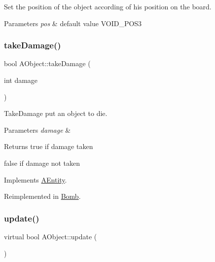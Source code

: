 Set the position of the object according of his position on the board. 


\begin{DoxyParams}{Parameters}
{\em pos} & default value V\+O\+I\+D\+\_\+\+P\+O\+S3 \\
\hline
\end{DoxyParams}
\mbox{\label{class_a_object_a39b1720ae5a820512ab4db0906f03b15}} 
\subsubsection{\texorpdfstring{take\+Damage()}{takeDamage()}}
{\footnotesize\ttfamily bool A\+Object\+::take\+Damage (\begin{DoxyParamCaption}\item[{int}]{damage }\end{DoxyParamCaption})\hspace{0.3cm}{\ttfamily [virtual]}}



Take\+Damage put an object to die. 


\begin{DoxyParams}{Parameters}
{\em damage} & \\
\hline
\end{DoxyParams}
\begin{DoxyReturn}{Returns}
true if damage taken 

false if damage not taken 
\end{DoxyReturn}


Implements \hyperlink{class_a_entity_ac01e24195a8ba249c855120ac017770e}{A\+Entity}.



Reimplemented in \hyperlink{class_bomb_ac51b260cdfef0cde903a88003994276e}{Bomb}.

\mbox{\label{class_a_object_af35bb4b68af0a11bb1fcf617bde41ecd}} 
\subsubsection{\texorpdfstring{update()}{update()}}
{\footnotesize\ttfamily virtual bool A\+Object\+::update (\begin{DoxyParamCaption}{ }\end{DoxyParamCaption})\hspace{0.3cm}{\ttfamily [pure virtual]}}



